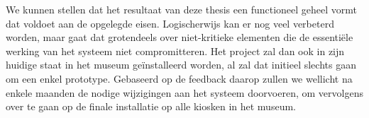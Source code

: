 We kunnen stellen dat het resultaat van deze thesis een functioneel geheel vormt dat voldoet aan de opgelegde eisen. Logischerwijs kan er nog veel verbeterd worden, maar gaat dat grotendeels over niet-kritieke elementen die de essentiële werking van het systeem niet compromitteren. Het project zal dan ook in zijn huidige staat in het museum geïnstalleerd worden, al zal dat initieel slechts gaan om een enkel prototype. Gebaseerd op de feedback daarop zullen we wellicht na enkele maanden de nodige wijzigingen aan het systeem doorvoeren, om vervolgens over te gaan op de finale installatie op alle kiosken in het museum.

\clearpage


%
%

\listoffigures

\clearpage


%
%

\renewcommand{\lstlistlistingname}{Lijst van fragmenten}
\renewcommand{\lstlistingname}{Fragment}
\lstlistoflistings

\clearpage


%
%



